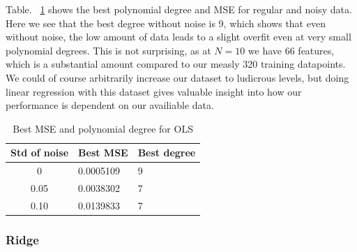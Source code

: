 \documentclass[twocolumn,10pt,cleanfoot]{asme2ej}
\begin{document}
Table. ~\ref{ols_mse_table} shows the best polynomial degree and MSE for regular and noisy data. Here we see that the best degree without noise is 9, which shows that even without noise, the low amount of data leads to a slight overfit even at very small polynomial degrees. This is not surprising, as at $N = 10$ we have $66$ features, which is a substantial amount compared to our measly 320 training datapoints. We could of course arbitrarily increase our dataset to ludicrous levels, but doing linear regression with this dataset gives valuable insight into how our performance is dependent on our availiable data.

\begin{table}[t]
\caption{Best MSE and polynomial degree for OLS}
\begin{center}
\label{ols_mse_table}
\begin{tabular}{c l l}
Std of noise & Best MSE & Best degree \\
\hline
0 & 0.0005109 & 9\\
0.05 & 0.0038302 & 7 \\
0.10 & 0.0139833 & 7 \\
\hline
\end{tabular}
\end{center}
\end{table}

\subsubsection{Ridge}
\end{document}

